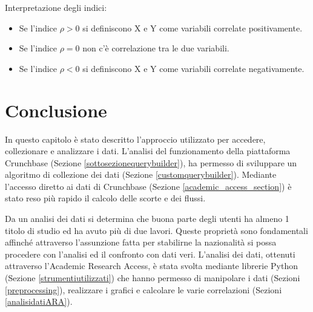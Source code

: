 Interpretazione degli indici:
\begin{itemize}
    \item Se l'indice \(\rho > 0\) si definiscono X e Y come variabili correlate positivamente.
    \item Se l'indice \(\rho = 0\) non c'è correlazione tra le due variabili.
    \item Se l'indice \(\rho < 0\) si definiscono X e Y come variabili correlate negativamente.
\end{itemize}



\section{Conclusione}
In questo capitolo è stato descritto l'approccio utilizzato per accedere, collezionare e analizzare i dati. 
L'analisi del funzionamento della piattaforma Crunchbase (Sezione \ref{sottosezionequerybuilder}), ha permesso di sviluppare un algoritmo di collezione dei dati (Sezione \ref{customquerybuilder}). 
Mediante l'accesso diretto ai dati di Crunchbase (Sezione \ref{academic_access_section}) è stato reso più rapido il calcolo delle scorte e dei flussi. 

Da un analisi dei dati si determina che buona parte degli utenti ha almeno 1 titolo di studio ed ha avuto più di due lavori. Queste proprietà sono fondamentali affinché attraverso l'assunzione fatta per stabilirne la nazionalità si possa procedere con l'analisi ed il confronto con dati veri.
L'analisi dei dati, ottenuti attraverso l'Academic Research Access, è stata svolta mediante librerie Python (Sezione \ref{strumentiutilizzati}) che hanno permesso di manipolare i dati (Sezioni \ref{preprocessing}), realizzare i grafici e calcolare le varie correlazioni (Sezioni \ref{analisidatiARA}).